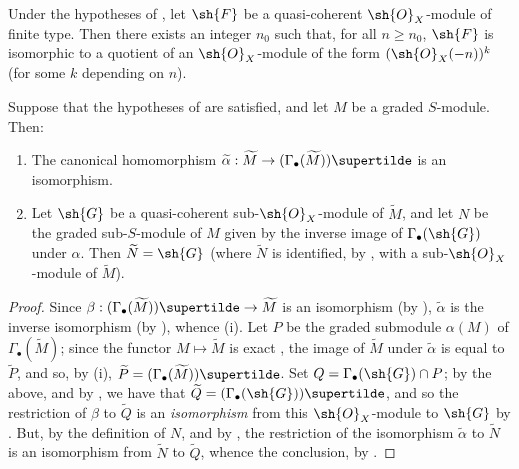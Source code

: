 \begin{corollary}[2.7.10]
\label{II.2.7.10}
Under the hypotheses of , let $\sh{F}$ be a quasi-coherent $\sh{O}_X$-module of finite type.
Then there exists an integer $n_0$ such that, for all $n\geq n_0$, $\sh{F}$ is isomorphic to a quotient of an $\sh{O}_X$-module of the form $(\sh{O}_X(-n))^k$ (for some $k$ depending on $n$).
\end{corollary}

\begin{proposition}[2.7.11]
\label{II.2.7.11}
Suppose that the hypotheses of  are satisfied, and let $M$ be a graded $S$-module.
Then:
\begin{enumerate}
  \item[{\rm(i)}] The canonical homomorphism $\widetilde{\alpha}:\widetilde{M}\to(\Gamma_\bullet(\widetilde{M}))\supertilde$ is an isomorphism.
  \item[{\rm(ii)}] Let $\sh{G}$ be a quasi-coherent sub-$\sh{O}_X$-module of $\widetilde{M}$, and let $N$ be the graded sub-$S$-module of $M$ given by the inverse image of $\Gamma_\bullet(\sh{G})$ under $\alpha$.
    Then $\widetilde{N}=\sh{G}$ (where $\widetilde{N}$ is identified, by , with a sub-$\sh{O}_X$-module of $\widetilde{M}$).
\end{enumerate}
\end{proposition}

\begin{proof}
Since $\beta:(\Gamma_\bullet(\widetilde{M}))\supertilde\to\widetilde{M}$ is an isomorphism (by ), $\widetilde{\alpha}$ is the inverse isomorphism (by ), whence (i).
Let $P$ be the graded submodule $\alpha(M)$ of $\Gamma_\bullet(\widetilde{M})$;
since the functor $M\mapsto\widetilde{M}$ is exact , the image of $\widetilde{M}$ under $\widetilde{\alpha}$ is equal to $\widetilde{P}$, and so, by (i), $\widetilde{P}=(\Gamma_\bullet(\widetilde{M}))\supertilde$.
Set $Q=\Gamma_\bullet(\sh{G})\cap P$;
by the above, and by , we have that $\widetilde{Q}=(\Gamma_\bullet(\sh{G}))\supertilde$, and so the restriction of $\beta$ to $\widetilde{Q}$ is an \emph{isomorphism} from this $\sh{O}_X$-module to $\sh{G}$ by .
But, by the definition of $N$, and by , the restriction of the isomorphism $\widetilde{\alpha}$ to $\widetilde{N}$ is an isomorphism from $\widetilde{N}$ to $\widetilde{Q}$, whence the conclusion, by .
\end{proof}


